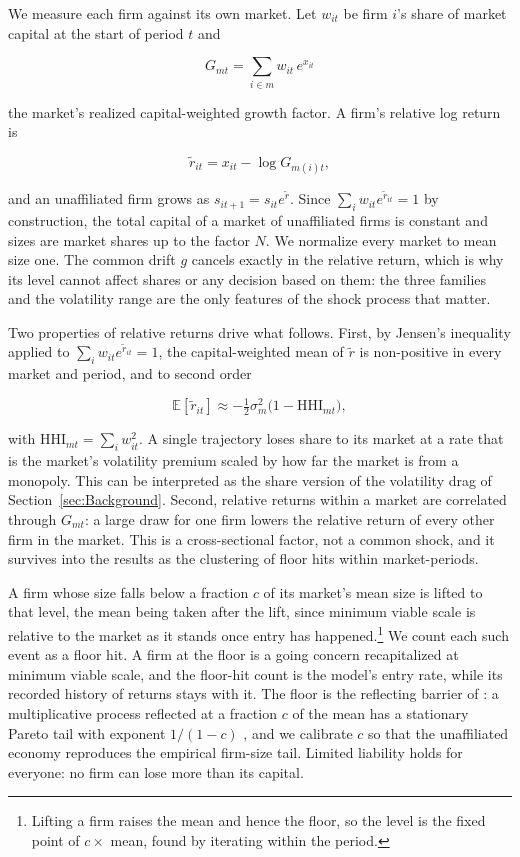 \documentclass[12pt,a4paper]{article}
\begin{document}
We measure each firm against its own market. Let $w_{it}$ be firm $i$'s share of market capital at the start of period $t$ and


$$G_{mt} = \sum_{i \in m} w_{it}\, e^{x_{it}}$$

the market's realized capital-weighted growth factor. A firm's relative log return is

$$\tilde r_{it} = x_{it} - \log G_{m(i)t},$$

and an unaffiliated firm grows as $s_{it+1} = s_{it} e^{\tilde{r}}$. Since $\sum_i w_{it} e^{\tilde{r}_{it}} = 1$ by construction, the total capital of a market of unaffiliated firms is constant and sizes are market shares up to the factor $N$. We normalize every market to mean size one. The common drift $g$ cancels exactly in the relative return, which is why its level cannot affect shares or any decision based on them: the three families and the volatility range are the only features of the shock process that matter.

Two properties of relative returns drive what follows. First, by Jensen's inequality applied to $\sum_i w_{it} e^{\tilde{r}_{it}} = 1$, the capital-weighted mean of $\tilde{r}$ is non-positive in every market and period, and to second order

$$\mathbb{E}[\tilde r_{it}] \approx -\tfrac{1}{2}\sigma_m^2 \bigl(1 - \mathrm{HHI}_{mt}\bigr),$$

with $\mathrm{HHI}_{mt} = \sum_i w_{it}^2$. A single trajectory loses share to its market at a rate that is the market's volatility premium scaled by how far the market is from a monopoly. This can be interpreted as the share version of the volatility drag of Section~\ref{sec:Background}. Second, relative returns within a market are correlated through $G_{mt}$: a large draw for one firm lowers the relative return of every other firm in the market. This is a cross-sectional factor, not a common shock, and it survives into the results as the clustering of floor hits within market-periods.

A firm whose size falls below a fraction $c$ of its market's mean size is lifted to that level, the mean being taken after the lift, since minimum viable scale is relative to the market as it stands once entry has happened.\footnote{Lifting a firm raises the mean and hence the floor, so the level is the fixed point of $c \times$ mean, found by iterating within the period.} We count each such event as a floor hit. A firm at the floor is a going concern recapitalized at minimum viable scale, and the floor-hit count is the model's entry rate, while its recorded history of returns stays with it. The floor is the reflecting barrier of \textcite{levy1996power}: a multiplicative process reflected at a fraction $c$ of the mean has a stationary Pareto tail with exponent $1/(1 - c)$ \parencite{gabaix1999zipf}, and we calibrate $c$ so that the unaffiliated economy reproduces the empirical firm-size tail. Limited liability holds for everyone: no firm can lose more than its capital. 
\end{document}
